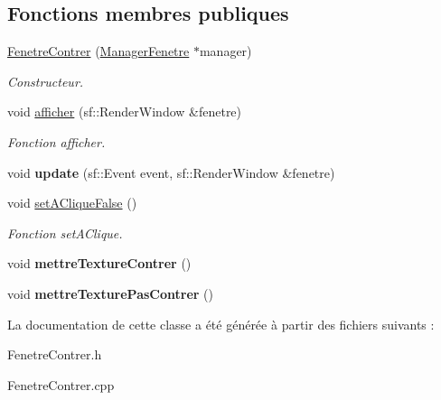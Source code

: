 \subsection*{\-Fonctions membres publiques}
\begin{DoxyCompactItemize}
\item 
\hypertarget{classFenetreContrer_ad12845e09d71a7a953f6c4c210372a2f}{\hyperlink{classFenetreContrer_ad12845e09d71a7a953f6c4c210372a2f}{\-Fenetre\-Contrer} (\hyperlink{classManagerFenetre}{\-Manager\-Fenetre} $\ast$manager)}\label{classFenetreContrer_ad12845e09d71a7a953f6c4c210372a2f}

\begin{DoxyCompactList}\small\item\em \-Constructeur. \end{DoxyCompactList}\item 
\hypertarget{classFenetreContrer_a3682a7b1516367d2ff24e7ebd1ae3994}{void \hyperlink{classFenetreContrer_a3682a7b1516367d2ff24e7ebd1ae3994}{afficher} (sf\-::\-Render\-Window \&fenetre)}\label{classFenetreContrer_a3682a7b1516367d2ff24e7ebd1ae3994}

\begin{DoxyCompactList}\small\item\em \-Fonction afficher. \end{DoxyCompactList}\item 
\hypertarget{classFenetreContrer_af72ced88abfef3118fe2619566635ac3}{void {\bfseries update} (sf\-::\-Event event, sf\-::\-Render\-Window \&fenetre)}\label{classFenetreContrer_af72ced88abfef3118fe2619566635ac3}

\item 
\hypertarget{classFenetreContrer_ad3fdefb81ef4bd85a4898070cda895b5}{void \hyperlink{classFenetreContrer_ad3fdefb81ef4bd85a4898070cda895b5}{set\-A\-Clique\-False} ()}\label{classFenetreContrer_ad3fdefb81ef4bd85a4898070cda895b5}

\begin{DoxyCompactList}\small\item\em \-Fonction set\-A\-Clique. \end{DoxyCompactList}\item 
\hypertarget{classFenetreContrer_a50596263fbf3849d9930e086705e51cc}{void {\bfseries mettre\-Texture\-Contrer} ()}\label{classFenetreContrer_a50596263fbf3849d9930e086705e51cc}

\item 
\hypertarget{classFenetreContrer_aa99b1baabdeaf904ac58623223ec1064}{void {\bfseries mettre\-Texture\-Pas\-Contrer} ()}\label{classFenetreContrer_aa99b1baabdeaf904ac58623223ec1064}

\end{DoxyCompactItemize}


\-La documentation de cette classe a été générée à partir des fichiers suivants \-:\begin{DoxyCompactItemize}
\item 
\-Fenetre\-Contrer.\-h\item 
\-Fenetre\-Contrer.\-cpp\end{DoxyCompactItemize}
